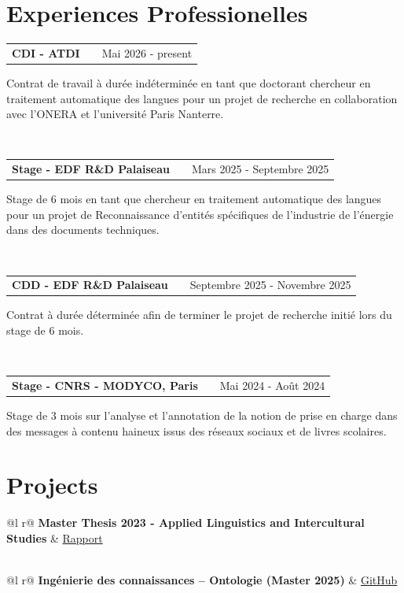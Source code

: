\documentclass[a4paper,12pt]{article}
\makeatletter
\newenvironment{jobshort}[2]
    {
    \begin{tabularx}{\linewidth}{@{}l X r@{}}
    \textbf{#1} & \hfill &  #2 \\[3.75pt]
    \end{tabularx}
    }
    {
    }
\makeatother
\begin{document}
\section{Experiences Professionelles}

\begin{jobshort}{CDI - ATDI}{Mai 2026 - present}
Contrat de travail à durée indéterminée en tant que doctorant chercheur en traitement automatique des langues pour un projet de recherche en collaboration avec l'ONERA et l'université Paris Nanterre. 
\end{jobshort}\

\begin{jobshort}{Stage - EDF R\&D Palaiseau}{Mars 2025 - Septembre 2025}
Stage de 6 mois en tant que chercheur en traitement automatique des langues pour un projet de Reconnaissance d'entités spécifiques de l'industrie de l'énergie dans des documents techniques.
\end{jobshort}\

\begin{jobshort}{CDD - EDF R\&D Palaiseau}{Septembre 2025 - Novembre 2025}
Contrat à durée déterminée afin de terminer le projet de recherche initié lors du stage de 6 mois. 
\end{jobshort}\

\begin{jobshort}{Stage - CNRS - MODYCO, Paris}{Mai 2024 - Août 2024}
Stage de 3 mois sur l'analyse et l'annotation de la notion de prise en charge dans des messages à contenu haineux issus des réseaux sociaux et de livres scolaires.
\end{jobshort}

\section{Projects}

\begin{tabularx}{\linewidth}{ @{}l r@{} }
\textbf{Master Thesis 2023 - Applied Linguistics and Intercultural Studies} & \hfill \href{https://github.com/ASVienot/MasterThesis_Anglicisms_in_French_Medias}{Rapport} \\[3.75pt]
  \\
\end{tabularx}


\begin{tabularx}{\linewidth}{ @{}l r@{} }
\textbf{Ingénierie des connaissances -- Ontologie (Master 2025)}
& \hfill \href{https://github.com/ASVienot/ontologie_masterTAL}{GitHub} \\[3.75pt]
 \\
\end{tabularx}
\end{document}
